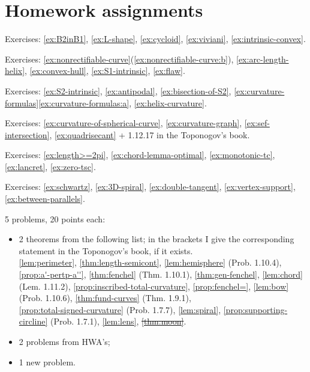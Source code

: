 \chapter{Homework assignments}

Exercises: 
\ref{ex:B2inB1}, 
\ref{ex:L-shape}, 
\ref{ex:cycloid}, 
\ref{ex:viviani}, 
\ref{ex:intrinsic-convex}.

Exercises: 
\ref{ex:nonrectifiable-curve}(\ref{ex:nonrectifiable-curve:b}), 
\ref{ex:arc-length-helix}, 
\ref{ex:convex-hull},  
\ref{ex:S1-intrinsic},  
\ref{ex:flaw}.

Exercises:
\ref{ex:S2-intrinsic},
\ref{ex:antipodal},
\ref{ex:bisection-of-S2}, 
\ref{ex:curvature-formulas}\ref{ex:curvature-formulas:a},    
\ref{ex:helix-curvature}.


Exercises:
\ref{ex:curvature-of-spherical-curve},
\ref{ex:curvature-graph},
\ref{ex:sef-intersection},
\ref{ex:quadrisecant} 
+
1.12.17 in the Toponogov's book.

Exercises:
\ref{ex:length>=2pi},
\ref{ex:chord-lemma-optimal},
\ref{ex:monotonic-tc},
\ref{ex:lancret},
\ref{ex:zero-tsc}.

Exercises:
\ref{ex:schwartz},
\ref{ex:3D-spiral},
\ref{ex:double-tangent},
\ref{ex:vertex-support},
\ref{ex:between-parallels}.

\noindent{\rule{\textwidth}{.1mm}}

 5 problems, 20 points each:
\begin{itemize}
\item 2 theorems from the following list; in the brackets I give the corresponding statement in the Toponogov's book, if it exists.\\
\ref{lem:perimeter},
\ref{thm:length-semicont},
\ref{lem:hemisphere} (Prob. 1.10.4),\\
\ref{prop:a'-pertp-a''},
\ref{thm:fenchel} (Thm. 1.10.1),
\ref{thm:gen-fenchel},
\ref{lem:chord} (Lem. 1.11.2),
\ref{prop:inscribed-total-curvature},
\ref{prop:fenchel=},
\ref{lem:bow} (Prob. 1.10.6),
\ref{thm:fund-curves} (Thm. 1.9.1),\\
\ref{prop:total-signed-curvature} (Prob. 1.7.7),
\ref{lem:spiral},
\ref{prop:supporting-circline} (Prob. 1.7.1),
\ref{lem:lens},
\sout{\ref{thm:moon}}.
\item 2 problems from HWA's;
\item 1 new problem.
\end{itemize}

